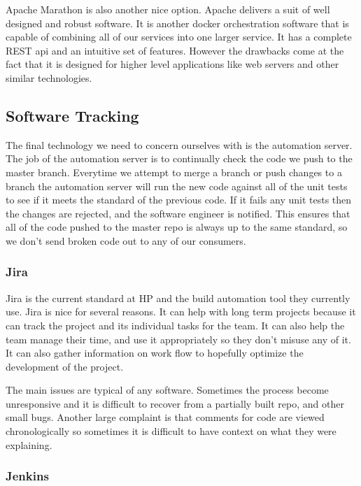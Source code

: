 \documentclass[onecolumn, draftclsnofoot,10pt, compsoc]{IEEEtran}
\begin{document}
Apache Marathon is also another nice option. Apache delivers a suit of well designed and robust software. It is another docker orchestration software that is capable of combining all of our services into one larger service. It has a complete REST api and an intuitive set of features. However the drawbacks come at the fact that it is designed for higher level applications like web servers and other similar technologies.

\subsection{Software Tracking}

The final technology we need to concern ourselves with is the automation server. The job of the automation server is to continually check the code we push to the master branch. Everytime we attempt to merge a branch or push changes to a branch the automation server will run the new code against all of the unit tests to see if it meets the standard of the previous code. If it fails any unit tests then the changes are rejected, and the software engineer is notified. This ensures that all of the code pushed to the master repo is always up to the same standard, so we don't send broken code out to any of our consumers.

\subsubsection{Jira}

Jira is the current standard at HP and the build automation tool they currently use. Jira is nice for several reasons. It can help with long term projects because it can track the project and its individual tasks for the team. It can also help the team manage their time, and use it appropriately so they don't misuse any of it. It can also gather information on work flow to hopefully optimize the development of the project. 

The main issues are typical of any software. Sometimes the process become unresponsive and it is difficult to recover from a partially built repo, and other small bugs. Another large complaint is that comments for code are viewed chronologically so sometimes it is difficult to have context on what they were explaining.

\subsubsection{Jenkins}
\end{document}

